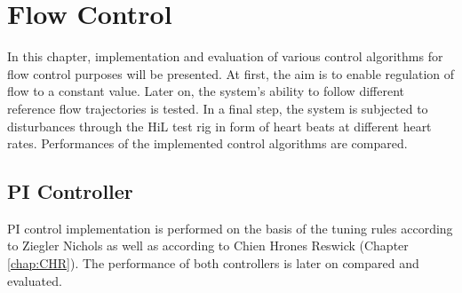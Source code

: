 \chapter{Flow Control}
In this chapter, implementation and evaluation of various control algorithms for flow control purposes will be presented. At first, the aim is to enable regulation of flow to a constant value. Later on, the system's ability to follow different reference flow trajectories is tested. In a final step, the system is subjected to disturbances through the HiL test rig in form of heart beats at different heart rates. Performances of the implemented control algorithms are compared.
\section{PI Controller}
PI control implementation is performed on the basis of the tuning rules according to Ziegler Nichols as well as according to Chien Hrones Reswick (Chapter \ref{chap:CHR}). The performance of both controllers is later on  compared and evaluated.
